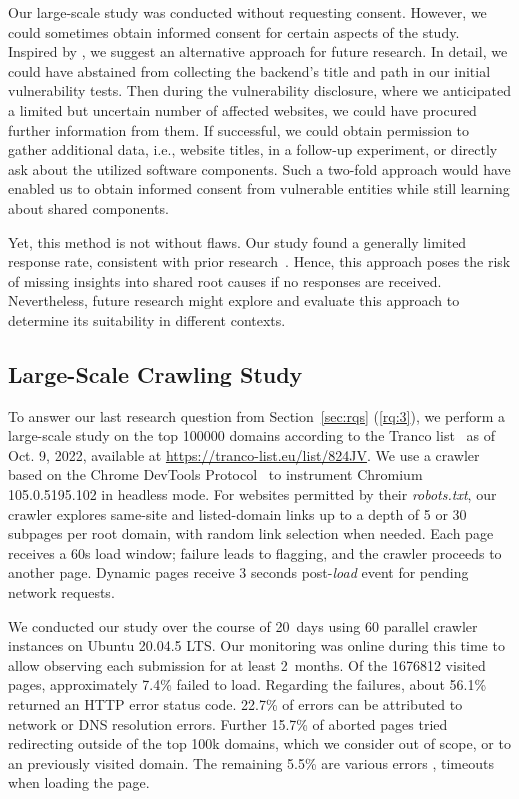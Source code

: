 Our large-scale study was conducted without requesting consent.
However, we could sometimes obtain informed consent for certain aspects of the study.
Inspired by \citet{utz2023privacy}, we suggest an alternative approach for future research.
In detail, we could have abstained from collecting the backend's title and path in our initial vulnerability tests.
Then during the vulnerability disclosure, where we anticipated a limited but uncertain number of affected websites, we could have procured further information from them.
If successful, we could obtain permission to gather additional data, i.e., website titles, in a follow-up experiment, or directly ask about the utilized software components.
Such a two-fold approach would have enabled us to obtain informed consent from vulnerable entities while still learning about shared components.

Yet, this method is not without flaws.
Our study found a generally limited response rate, consistent with prior research~\cite{stock2018hear}.
Hence, this approach poses the risk of missing insights into shared root causes if no responses are received.
Nevertheless, future research might explore and evaluate this approach to determine its suitability in different contexts.  



\subsection{Large-Scale Crawling Study}\label{sec:main-study}


To answer our last research question from Section~\ref{sec:rqs} (\ref{rq:3}), we perform a large-scale study on the top \num{100000} domains according to the Tranco list~\cite{le-pochat-tranco} as of Oct. 9, 2022, available at \url{https://tranco-list.eu/list/824JV}.
We use a crawler  based on the Chrome DevTools Protocol~\cite{chrome-dev-protocol} to instrument Chromium 105.0.5195.102 in headless mode.
For websites permitted by their \emph{robots.txt}, our crawler explores same-site and listed-domain links up to a depth of \num{5} or \num{30} subpages per root domain, with random link selection when needed. 
Each page receives a \num{60}\si{\s} load window; failure leads to flagging, and the crawler proceeds to another page. 
Dynamic pages receive \num{3} seconds post-\textit{load} event for pending network requests.

We conducted our study over the course of \num{20}~days using 60 parallel crawler instances on Ubuntu 20.04.5 LTS.
Our monitoring was online during this time to allow observing each submission for at least \num{2}~months.
Of the \num{1676812} visited pages, approximately 7.4\% failed to load.
Regarding the failures, about 56.1\% returned an HTTP error status code.
22.7\% of errors can be attributed to network or DNS resolution errors.
Further 15.7\% of aborted pages tried redirecting outside of the top \num{100}k domains, which we consider out of scope, or to an previously visited domain.%
The remaining 5.5\% are various errors \eg, timeouts when loading the page.


